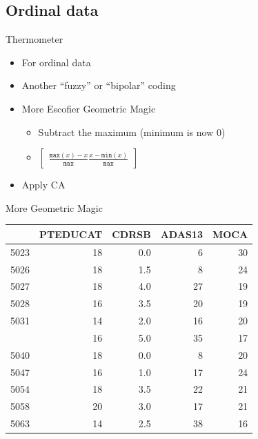 \documentclass[
  ignorenonframetext,
]{beamer}
\providecommand{\tightlist}{%
  \setlength{\itemsep}{0pt}\setlength{\parskip}{0pt}}
\begin{document}
\hypertarget{ordinal-data}{%
\subsection{Ordinal data}\label{ordinal-data}}

\begin{frame}{Thermometer}
\protect\hypertarget{thermometer}{}

\begin{itemize}[<+->]
\tightlist
\item
  For ordinal data
\item
  Another ``fuzzy'' or ``bipolar'' coding
\item
  More Escofier Geometric Magic

  \begin{itemize}[<+->]
  \tightlist
  \item
    Subtract the maximum (minimum is now \(0\))
  \item
    \(\begin{bmatrix} \frac{\texttt{max}(x)-x}{\texttt{max}} \frac{x-\texttt{min}(x)}{\texttt{max}}\end{bmatrix}\)
  \end{itemize}
\item
  Apply CA
\end{itemize}

\end{frame}

\begin{frame}{More Geometric Magic}
\protect\hypertarget{more-geometric-magic}{}

\begin{table}[H]
\centering\begingroup\fontsize{7}{9}\selectfont

\begin{tabular}{lrrrr}
\toprule
  & PTEDUCAT & CDRSB & ADAS13 & MOCA\\
\midrule
5023 & 18 & 0.0 & 6 & 30\\
5026 & 18 & 1.5 & 8 & 24\\
5027 & 18 & 4.0 & 27 & 19\\
5028 & 16 & 3.5 & 20 & 19\\
5031 & 14 & 2.0 & 16 & 20\\
\addlinespace
5037 & 16 & 5.0 & 35 & 17\\
5040 & 18 & 0.0 & 8 & 20\\
5047 & 16 & 1.0 & 17 & 24\\
5054 & 18 & 3.5 & 22 & 21\\
5058 & 20 & 3.0 & 17 & 21\\
5063 & 14 & 2.5 & 38 & 16\\
\bottomrule
\end{tabular}\endgroup{}
\end{table}

\end{frame}
\end{document}
